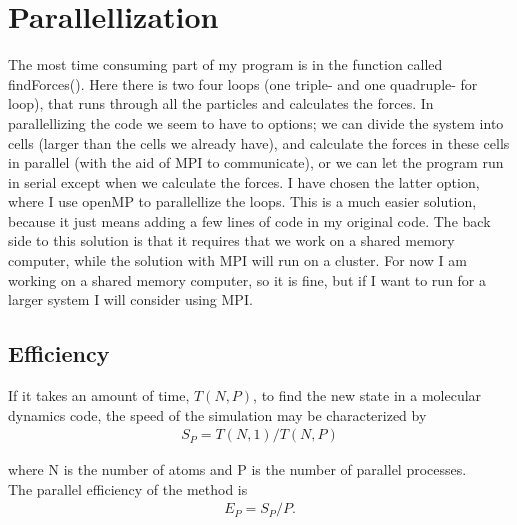 \section{Parallellization}
The most time consuming part of my program is in the function called findForces(). Here there is two four loops (one triple- and one quadruple- for loop), that
runs through all the particles and calculates the forces. In parallellizing the code we seem to have to options; we can divide the system into cells (larger than the cells we already have), and calculate the forces 
in these cells in parallel (with the aid of MPI to communicate), or we can let the program run in serial except when we calculate the forces. I have chosen the latter option, where I use openMP to parallellize the loops.
This is a much easier solution, because it just means adding a few lines of code in my original code. The back side to this solution is that it requires that we work on a shared memory computer, while the solution with
MPI will run on a cluster. For now I am working on a shared memory computer, so it is fine, but if I want to run for a larger system I will consider using MPI.\\
\subsection{Efficiency}
If it takes an amount of time, $T(N,P)$, to find the new state in a molecular dynamics code, the speed of the simulation may be characterized by
\begin{align}
 S_P = T(N,1)/T(N,P)\nonumber
\end{align}


where N is the number of atoms and P is the number of parallel processes.\\
The parallel efficiency of the method is
\begin{align}
 E_P = S_P/P.
\end{align}

